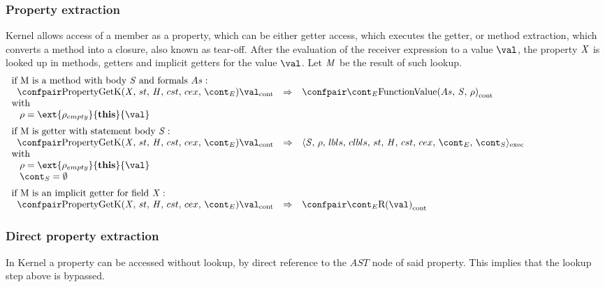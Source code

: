 \documentclass{article}
\begin{document}
\subsubsection{Property extraction}
\label{subsubsec:property-extraction}
Kernel allows access of a member as a property, which can be either getter access, which executes the getter, or method extraction, which converts a method into a closure, also known as tear-off.
\noindent
After the evaluation of the receiver expression to a value $\val$, the property $\mathit{X}$ is looked up in methods, getters and implicit getters for the value $\val$. Let $\mathit{M}$ be the result of such lookup.
\[
  \begin{array}{lcl@{\hspace{30mm}}}
	\textrm{if M is a method with body }\stmt\textrm{ and formals }\formals :\\
	\hspace{2mm}
	\cesktrans{
		\contconf{\PropertyGetK}{\val}}{
		\contconf{\econt}{\funval{\formals}{\stmt}{\env}}}\\
	\textrm{with}\\
	\hspace{3mm}
	\env = \ext{\env_{empty}}{\mathbf{this}}{\val}\\[2mm]

	\textrm{if M is getter with statement body }\stmt :\\
	\hspace{2mm}
	\cesktrans{
		\contconf{\PropertyGetK}{\val}}{
		\execconf{\stmt}{\env}{\lbls}{\clbls}{\handler}{\cstrace}{\cex}{\econt}{\scont}
		}\\
	\textrm{with}\\
	\hspace{3mm}
	\env = \ext{\env_{empty}}{\mathbf{this}}{\val}\\
	\hspace{3mm}
	\scont = \emptyset\\[2mm]

	\textrm{if M is an implicit getter for field }\idmeta :\\
	\hspace{2mm}
	\cesktrans{
		\contconf{\PropertyGetK}{\val}}{
		\contconf{\econt}{\textrm{R}(\val)}}
  \end{array}
\]

\subsubsection{Direct property extraction}
\label{subsubsec:direct-property-extraction}
In Kernel a property can be accessed without lookup, by direct reference to the $AST$ node of said property. This implies that the lookup step above is bypassed.
\end{document}
